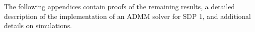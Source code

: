 
	    
	       
	             








The following appendices contain proofs of the remaining results, a detailed description of the implementation of an ADMM solver for SDP 1, and additional details on simulations.  


